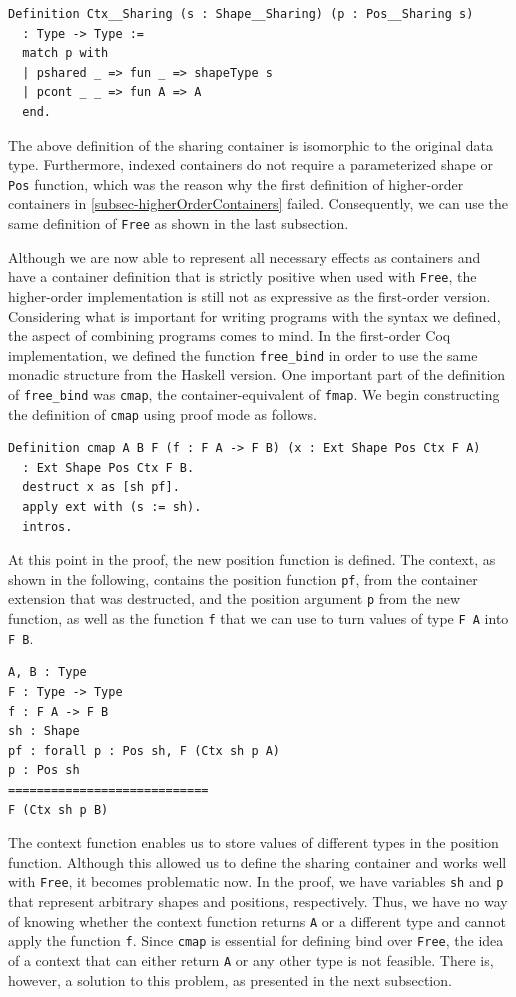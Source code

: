 \documentclass[a4paper, 11pt, fleqn, twoside, abstract=on]{scrreprt}
\newcommand{\cinl}[1]{\texttt{#1}}
\begin{document}
\begin{verbatim}
Definition Ctx__Sharing (s : Shape__Sharing) (p : Pos__Sharing s) 
  : Type -> Type :=
  match p with
  | pshared _ => fun _ => shapeType s
  | pcont _ _ => fun A => A
  end.
\end{verbatim}

The above definition of the sharing container is isomorphic to the original data type.
Furthermore, indexed containers do not require a parameterized shape or \cinl{Pos} function, which was the reason why the first definition of higher-order containers in \autoref{subsec-higherOrderContainers} failed.
Consequently, we can use the same definition of \cinl{Free} as shown in the last subsection.

Although we are now able to represent all necessary effects as containers and have a container definition that is strictly positive when used with \cinl{Free}, the higher-order implementation is still not as expressive as the first-order version.
Considering what is important for writing programs with the syntax we defined, the aspect of combining programs comes to mind.
In the first-order Coq implementation, we defined the function \cinl{free_bind} in order to use the same monadic structure from the Haskell version.
One important part of the definition of \cinl{free_bind} was \cinl{cmap}, the container-equivalent of \cinl{fmap}.
We begin constructing the definition of \cinl{cmap} using proof mode as follows.

\begin{verbatim}
Definition cmap A B F (f : F A -> F B) (x : Ext Shape Pos Ctx F A) 
  : Ext Shape Pos Ctx F B.
  destruct x as [sh pf].
  apply ext with (s := sh).
  intros.
\end{verbatim}

At this point in the proof, the new position function is defined.
The context, as shown in the following, contains the position function \cinl{pf}, from the container extension that was destructed, and the position argument \cinl{p} from the new function, as well as the function \cinl{f} that we can use to turn values of type \cinl{F A} into \cinl{F B}.

\begin{verbatim}
A, B : Type
F : Type -> Type
f : F A -> F B
sh : Shape
pf : forall p : Pos sh, F (Ctx sh p A)
p : Pos sh
============================
F (Ctx sh p B)
\end{verbatim}

The context function enables us to store values of different types in the position function.
Although this allowed us to define the sharing container and works well with \cinl{Free}, it becomes problematic now.
In the proof, we have variables \cinl{sh} and \cinl{p} that represent arbitrary shapes and positions, respectively.
Thus, we have no way of knowing whether the context function returns \cinl{A} or a different type and cannot apply the function \cinl{f}.
Since \cinl{cmap} is essential for defining bind over \cinl{Free}, the idea of a context that can either return \cinl{A} or any other type is not feasible.
There is, however, a solution to this problem, as presented in the next subsection.
\end{document}
